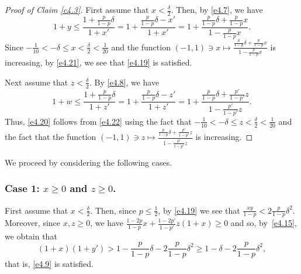 \documentclass[10pt,a4paper]{amsart}
\theoremstyle{remark}
\newcommand{\meg}{\geqslant}
\newcommand{\mik}{\leqslant}
\begin{document}
\begin{proof}[Proof of Claim \emph{\ref{c4.3}}]
First assume that $x<\frac{\delta}{2}$. Then, by \eqref{e4.7}, we have
\begin{equation} \label{e4.21}
1+y\mik \frac{1+\frac{p}{1-p}\delta}{1+x'}=
1+\frac{\frac{p}{1-p}\delta-x'}{1+x'}=
1+\frac{\frac{p}{1-p}\delta+\frac{p}{1-p}x}{1-\frac{p}{1-p}x}.
\end{equation}
Since $-\frac{1}{10}<-\delta\mik x<\frac{\delta}{2}<\frac{1}{20}$ and the function
$(-1,1)\ni x\mapsto \frac{\frac{p}{1-p}\delta+\frac{p}{1-p}x}{1-\frac{p}{1-p}x}$ is increasing,
by \eqref{e4.21}, we see that \eqref{e4.19} is satisfied.

Next assume that $z<\frac{\delta}{2}$. By \eqref{e4.8}, we have
\begin{equation} \label{e4.22}
1+w \mik \frac{1+\frac{p}{1-p}\delta}{1+z'} = 1+\frac{\frac{p}{1-p}\delta-z'}{1+z'}=
1+\frac{\frac{p}{1-p}\delta+\frac{p'}{1-p'}z}{1-\frac{p'}{1-p'}z}.
\end{equation}
Thus, \eqref{e4.20} follows from \eqref{e4.22} using the fact that
$-\frac{1}{10}<-\delta\mik z< \frac{\delta}{2}<\frac{1}{20}$ and the fact that the function
$(-1,1)\ni z\mapsto \frac{\frac{p}{1-p}\delta+\frac{p'}{1-p'}z}{1-\frac{p'}{1-p'}z}$ is increasing.
\end{proof}

We proceed by considering the following cases.

\subsubsection*{Case 1: $x\meg 0$ and $z\meg 0$.} First assume that $x<\frac{\delta}{2}$.
Then, since $p\mik \frac{1}{2}$, by \eqref{e4.19} we see that $\frac{xy}{1-p}< 2\frac{p}{1-p}\delta^2$.
Moreover, since $x,z\meg 0$, we have $\frac{1-2p}{1-p}x+\frac{1-2p'}{1-p'}z(1+x)\meg 0$ and so, by~\eqref{e4.15},
we obtain that
\begin{equation} \label{e4.23}
(1+x)(1+y')> 1-\frac{p}{1-p}\delta-2\frac{p}{1-p}\delta^2\meg 1-\delta-2\frac{p}{1-p}\delta^2,
\end{equation}
that is, \eqref{e4.9} is satisfied.
\end{document}
